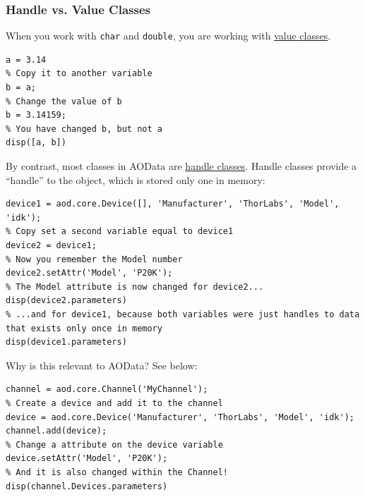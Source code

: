 \documentclass[10pt]{exam}
\newcommand\myurl[1]{\textcolor{blue}{\underline{#1}}}
\newcommand\matclass[1]{\textcolor{codeblue}{\texttt{#1}}}
\begin{document}
	\subsubsection{Handle vs. Value Classes}\label{subsubsection:HandleValue}
		\noindent When you work with \matclass{char} and \matclass{double}, you are working with \underline{value classes}. 
		\begin{lstlisting}[style=matlab-editor, basicstyle=\mlttfamily\footnotesize]
% Create a double variable
a = 3.14
% Copy it to another variable
b = a;
% Change the value of b
b = 3.14159;
% You have changed b, but not a
disp([a, b])
	\end{lstlisting}
	\noindent By contrast, most classes in AOData are \underline{handle classes}. Handle classes provide a ``handle'' to the object, which is stored only one in memory:
	\begin{lstlisting}[style=matlab-editor, basicstyle=\mlttfamily\footnotesize]
% Create a standalone Device class. It's from ThorLabs but you don't remember the Model
device1 = aod.core.Device([], 'Manufacturer', 'ThorLabs', 'Model', 'idk');
% Copy set a second variable equal to device1
device2 = device1;
% Now you remember the Model number
device2.setAttr('Model', 'P20K');
% The Model attribute is now changed for device2...
disp(device2.parameters)
% ...and for device1, because both variables were just handles to data that exists only once in memory
disp(device1.parameters)
		\end{lstlisting}
		\noindent Why is this relevant to AOData? See below:
		\begin{lstlisting}[style=matlab-editor, basicstyle=\mlttfamily\footnotesize]
% Create a channel
channel = aod.core.Channel('MyChannel');
% Create a device and add it to the channel
device = aod.core.Device('Manufacturer', 'ThorLabs', 'Model', 'idk');
channel.add(device);
% Change a attribute on the device variable
device.setAttr('Model', 'P20K');
% And it is also changed within the Channel!
disp(channel.Devices.parameters)
		\end{lstlisting}
	
\end{document}
